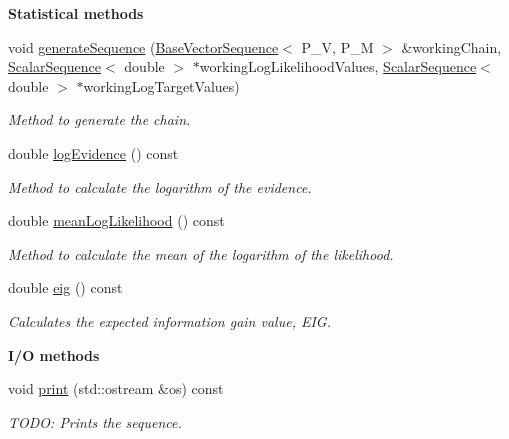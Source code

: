 \begin{Indent}{\bf Statistical methods}\par
\begin{DoxyCompactItemize}
\item 
void \hyperlink{class_q_u_e_s_o_1_1_m_l_sampling_a8d7296b30623c73ada38971cae27994a}{generate\-Sequence} (\hyperlink{class_q_u_e_s_o_1_1_base_vector_sequence}{Base\-Vector\-Sequence}$<$ P\-\_\-\-V, P\-\_\-\-M $>$ \&working\-Chain, \hyperlink{class_q_u_e_s_o_1_1_scalar_sequence}{Scalar\-Sequence}$<$ double $>$ $\ast$working\-Log\-Likelihood\-Values, \hyperlink{class_q_u_e_s_o_1_1_scalar_sequence}{Scalar\-Sequence}$<$ double $>$ $\ast$working\-Log\-Target\-Values)
\begin{DoxyCompactList}\small\item\em Method to generate the chain. \end{DoxyCompactList}\item 
double \hyperlink{class_q_u_e_s_o_1_1_m_l_sampling_ae870f4b12060ae67d0c4473828b142f1}{log\-Evidence} () const 
\begin{DoxyCompactList}\small\item\em Method to calculate the logarithm of the evidence. \end{DoxyCompactList}\item 
double \hyperlink{class_q_u_e_s_o_1_1_m_l_sampling_ace6bbf605f8b655e0671d20309160941}{mean\-Log\-Likelihood} () const 
\begin{DoxyCompactList}\small\item\em Method to calculate the mean of the logarithm of the likelihood. \end{DoxyCompactList}\item 
double \hyperlink{class_q_u_e_s_o_1_1_m_l_sampling_a31f7f977a3d42a06fdcd2918cc31bb40}{eig} () const 
\begin{DoxyCompactList}\small\item\em Calculates the expected information gain value, E\-I\-G. \end{DoxyCompactList}\end{DoxyCompactItemize}
\end{Indent}
\begin{Indent}{\bf I/\-O methods}\par
\begin{DoxyCompactItemize}
\item 
void \hyperlink{class_q_u_e_s_o_1_1_m_l_sampling_aec103dbc7af1af9e982d8c162033e77b}{print} (std\-::ostream \&os) const 
\begin{DoxyCompactList}\small\item\em T\-O\-D\-O\-: Prints the sequence. \end{DoxyCompactList}\end{DoxyCompactItemize}
\end{Indent}
